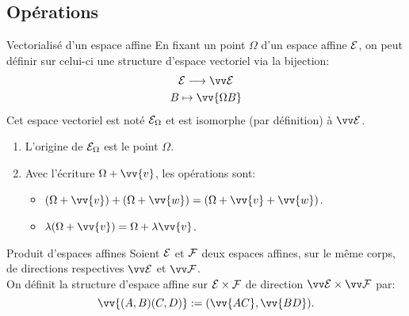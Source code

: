 \documentclass{m53beamer}
\begin{document}
\subsection{Opérations}
  \begin{frame}{Vectorialisé d'un espace affine}
    En fixant un point $\Omega$ d'un espace affine $\mathcal{E}$, on peut définir sur celui-ci une structure d'espace vectoriel via la bijection:
    \begin{gather*}
      \ens{E} \longrightarrow \ev{E}\\
      B \mapsto \vv{\Omega B}
    \end{gather*}\pause
    Cet espace vectoriel est noté $\mathcal{E}_{\Omega}$ et est isomorphe (par définition) à $\ev{E}$.
    \begin{enumerate}[<+(1)->]
      \item L'origine de $\mathcal{E}_{\Omega}$ est le point $\Omega$.
      \item Avec l'écriture $\Omega+\vv{v}$, les opérations sont:
      \begin{itemize}[<+(1)->]
        \item $(\Omega+\vv{v})+(\Omega+\vv{w})=(\Omega+\vv{v}+\vv{w})$.
        \item $\lambda(\Omega+\vv{v})=\Omega+\lambda\vv{v}$.
      \end{itemize}
    \end{enumerate}
  \end{frame}
  \begin{frame}{Produit d'espaces affines}
    Soient $\mathcal{E}$ et $\mathcal{F}$ deux espaces affines, sur le même corps, de directions respectives $\ev{E}$ et $\ev{F}$.\\
    On définit la structure d'espace affine  sur $\mathcal{E} \times \mathcal{F}$ de direction $\ev{E} \times \ev{F}$ par:
    $$
      \vv{(A,B)(C,D)}:=(\vv{AC},\vv{BD}).
    $$
  \end{frame}
\end{document}
